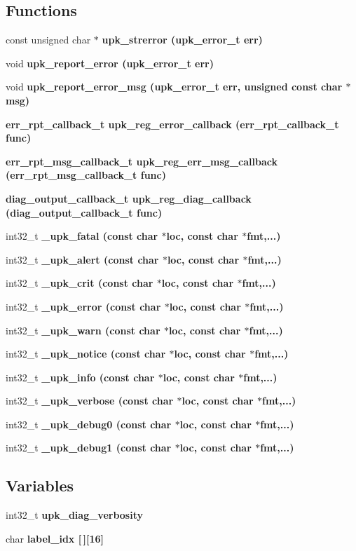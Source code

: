 \subsection*{Functions}
\begin{CompactItemize}
\item 
const unsigned char $\ast$ \bf{upk\_\-strerror} (\bf{upk\_\-error\_\-t} err)
\item 
void \bf{upk\_\-report\_\-error} (\bf{upk\_\-error\_\-t} err)
\item 
void \bf{upk\_\-report\_\-error\_\-msg} (\bf{upk\_\-error\_\-t} err, unsigned const char $\ast$msg)
\item 
\bf{err\_\-rpt\_\-callback\_\-t} \bf{upk\_\-reg\_\-error\_\-callback} (\bf{err\_\-rpt\_\-callback\_\-t} func)
\item 
\bf{err\_\-rpt\_\-msg\_\-callback\_\-t} \bf{upk\_\-reg\_\-err\_\-msg\_\-callback} (\bf{err\_\-rpt\_\-msg\_\-callback\_\-t} func)
\item 
\bf{diag\_\-output\_\-callback\_\-t} \bf{upk\_\-reg\_\-diag\_\-callback} (\bf{diag\_\-output\_\-callback\_\-t} func)
\item 
int32\_\-t \bf{\_\-upk\_\-fatal} (const char $\ast$loc, const char $\ast$fmt,...)
\item 
int32\_\-t \bf{\_\-upk\_\-alert} (const char $\ast$loc, const char $\ast$fmt,...)
\item 
int32\_\-t \bf{\_\-upk\_\-crit} (const char $\ast$loc, const char $\ast$fmt,...)
\item 
int32\_\-t \bf{\_\-upk\_\-error} (const char $\ast$loc, const char $\ast$fmt,...)
\item 
int32\_\-t \bf{\_\-upk\_\-warn} (const char $\ast$loc, const char $\ast$fmt,...)
\item 
int32\_\-t \bf{\_\-upk\_\-notice} (const char $\ast$loc, const char $\ast$fmt,...)
\item 
int32\_\-t \bf{\_\-upk\_\-info} (const char $\ast$loc, const char $\ast$fmt,...)
\item 
int32\_\-t \bf{\_\-upk\_\-verbose} (const char $\ast$loc, const char $\ast$fmt,...)
\item 
int32\_\-t \bf{\_\-upk\_\-debug0} (const char $\ast$loc, const char $\ast$fmt,...)
\item 
int32\_\-t \bf{\_\-upk\_\-debug1} (const char $\ast$loc, const char $\ast$fmt,...)
\end{CompactItemize}
\subsection*{Variables}
\begin{CompactItemize}
\item 
int32\_\-t \bf{upk\_\-diag\_\-verbosity}
\item 
char \bf{label\_\-idx} [$\,$][16]
\end{CompactItemize}


